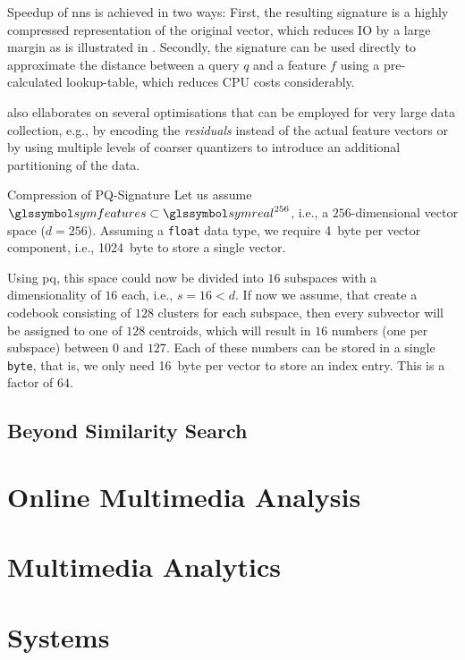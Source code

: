 Speedup of \acrshort{nns} is achieved in two ways: First, the resulting signature is a highly compressed representation of the original vector, which reduces IO by a large margin as is illustrated in . Secondly, the signature can be used directly to approximate the distance between a query $q$ and a feature $f$ using a pre-calculated lookup-table, which reduces CPU costs considerably. 

\cite{Jegou:2010Product} also ellaborates on several optimisations that can be employed for very large data collection, e.g., by encoding the \emph{residuals} instead of the actual feature vectors or by using multiple levels of coarser quantizers to introduce an additional partitioning of the data.

\begin{example}[label=example:pq_compression]{Compression of PQ-Signature}{}
    Let us assume $\symfeatures \subset \symreal^{256}$, i.e., a $256$-dimensional vector space ($d = 256$). Assuming a \texttt{float} data type, we require \SI{4}{byte} per vector component, i.e., \SI{1024}{byte} to store a single vector.
    
    Using \acrshort{pq}, this space could now be divided into $16$ subspaces with a dimensionality of $16$ each, i.e., $s = 16 < d$. If now we assume, that create a codebook consisting of $128$ clusters for each subspace, then every subvector will be assigned to one of $128$ centroids, which will result in $16$ numbers (one per subspace) between $0$ and $127$. Each of these numbers can be stored in a single \texttt{byte}, that is, we only need \SI{16}{byte} per vector to store an index entry. This is a factor of $64$.
\end{example}

\subsection{Beyond Similarity Search}

\section{Online Multimedia Analysis}

\section{Multimedia Analytics}

\section{Systems}